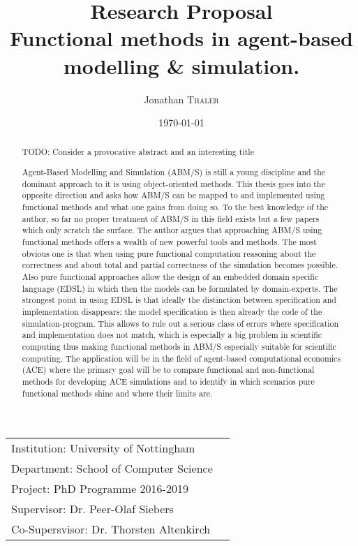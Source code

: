\documentclass{article}
\title{ {\normalsize Research Proposal} \\ Functional methods in agent-based modelling \& simulation.} %
\author{Jonathan \textsc{Thaler}} %
\date{\today} %
\begin{document}
\maketitle %

\begin{center}
\begin{tabular}{l r}
Institution: University of Nottingham \\
Department: School of Computer Science \\
Project: PhD Programme 2016-2019 \\
Supervisor: Dr. Peer-Olaf Siebers \\
Co-Supersvisor: Dr. Thorsten Altenkirch 
\end{tabular}
\end{center}

\begin{abstract}
TODO: Consider a provocative abstract and an interesting title

Agent-Based Modelling and Simulation (ABM/S) is still a young discipline and the dominant approach to it is using object-oriented methods. This thesis goes into the opposite direction and asks how ABM/S can be mapped to and implemented using functional methods and what one gains from doing so. To the best knowledge of the author, so far no proper treatment of ABM/S in this field exists but a few papers which only scratch the surface. The author argues that approaching ABM/S using functional methods offers a wealth of new powerful tools and methods. The most obvious one is that when using pure functional computation reasoning about the correctness and about total and partial correctness of the simulation becomes possible. Also pure functional approaches allow the design of an embedded domain specific language (EDSL) in which then the models can be formulated by domain-experts. The strongest point in using EDSL is that ideally the distinction between specification and implementation disappears: the model specification is then already the code of the simulation-program. This allows to rule out a serious class of errors where specification and implementation does not match, which is especially a big problem in scientific computing thus making functional methods in ABM/S especially suitable for scientific computing. The application will be in the field of agent-based computational economics (ACE) where the primary goal will be to compare functional and non-functional methods for developing ACE simulations and to identify in which scenarios pure functional methods shine and where their limits are.
\end{abstract}
\end{document}
